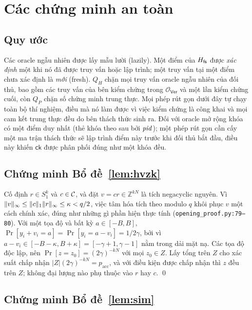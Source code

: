
\section{Các chứng minh an toàn}
\label{app:security-proofs}

\subsection{Quy ước}

Các oracle ngẫu nhiên được lấy mẫu lười (lazily). Một điểm của $H_{\mathsf{fs}}$ được
\emph{xác định} một khi nó đã được truy vấn hoặc lập trình; một truy vấn tại
một điểm chưa xác định là \emph{mới} (fresh). $Q_H$ chặn mọi truy vấn oracle
ngẫu nhiên của đối thủ, bao gồm các truy vấn của bên kiểm chứng trong
$\mathcal O_{\mathsf{Ver}}$ và một lần kiểm chứng cuối, còn $Q_P$ chặn số chứng
minh trung thực. Mọi phép rút gọn dưới đây tự chạy toàn bộ thí nghiệm, điều mà
nó làm được vì việc kiểm chứng là công khai và mọi cam kết trung thực đều do
bên thách thức sinh ra. Đối với oracle mở rộng khóa có một điểm duy nhất (thẻ
khóa theo sau bởi $\mathit{pid}$); một phép rút gọn cần cấy một ma trận thách thức sẽ
lập trình điểm này trước khi đối thủ bắt đầu, điều này khiến $\mathsf{ck}$ được
phân phối đúng như một khóa đều.

\subsection{Chứng minh Bổ đề~\ref{lem:hvzk}}

Cố định $r\in S_1^k$ và $c\in\mathcal{C}$, và đặt $v=cr\in\mathbb Z^{kN}$ là tích
negacyclic nguyên. Vì $\lVert v \rVert_\infty\le\lVert c \rVert_1\lVert r \rVert_\infty
\le\kappa<q/2$, việc tâm hóa tích theo modulo $q$ khôi phục $v$ một cách chính
xác, đúng như những gì phần hiện thực tính (\texttt{opening\_proof.py:79--80}).
Với một tọa độ và bất kỳ $a\in[-B,B]$, $\Pr[y_i+v_i=a]=\Pr[y_i=a-v_i]=1/2\gamma$,
bởi vì $a-v_i\in[-B-\kappa,B+\kappa]=[-\gamma+1,\gamma-1]$ nằm trong dải mặt nạ.
Các tọa độ độc lập, nên $\Pr[z=z_0]=(2\gamma)^{-kN}$ với mọi $z_0\in Z$. Lấy
tổng trên $Z$ cho xác suất chấp nhận $|Z|(2\gamma)^{-kN}=p_{\mathrm{acc}}$, và
với điều kiện được chấp nhận thì $z$ đều trên $Z$; không đại lượng nào phụ thuộc
vào $r$ hay $c$. \qed

\subsection{Chứng minh Bổ đề~\ref{lem:sim}}

